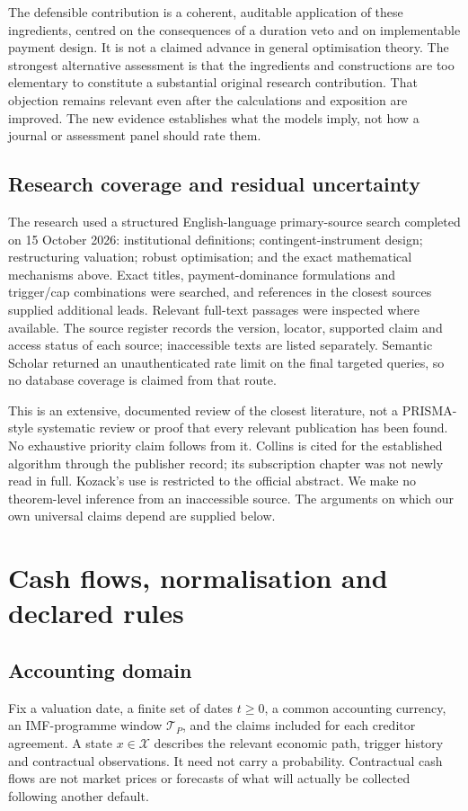 \documentclass[11pt,a4paper]{article}
\begin{document}
The defensible contribution is a coherent, auditable application of these ingredients, centred on the consequences of a duration veto and on implementable payment design. It is not a claimed advance in general optimisation theory. The strongest alternative assessment is that the ingredients and constructions are too elementary to constitute a substantial original research contribution. That objection remains relevant even after the calculations and exposition are improved. The new evidence establishes what the models imply, not how a journal or assessment panel should rate them.

\subsection{Research coverage and residual uncertainty}
The research used a structured English-language primary-source search completed on 15 October 2026: institutional definitions; contingent-instrument design; restructuring valuation; robust optimisation; and the exact mathematical mechanisms above. Exact titles, payment-dominance formulations and trigger/cap combinations were searched, and references in the closest sources supplied additional leads. Relevant full-text passages were inspected where available. The source register records the version, locator, supported claim and access status of each source; inaccessible texts are listed separately. Semantic Scholar returned an unauthenticated rate limit on the final targeted queries, so no database coverage is claimed from that route.

This is an extensive, documented review of the closest literature, not a PRISMA-style systematic review or proof that every relevant publication has been found. No exhaustive priority claim follows from it. Collins is cited for the established algorithm through the publisher record; its subscription chapter was not newly read in full. Kozack's use is restricted to the official abstract. We make no theorem-level inference from an inaccessible source. The arguments on which our own universal claims depend are supplied below.

\section{Cash flows, normalisation and declared rules}
\subsection{Accounting domain}
Fix a valuation date, a finite set of dates $t\geq0$, a common accounting currency, an IMF-programme window $\mathcal T_P$, and the claims included for each creditor agreement. A state $x\in\mathcal X$ describes the relevant economic path, trigger history and contractual observations. It need not carry a probability. Contractual cash flows are not market prices or forecasts of what will actually be collected following another default.
\end{document}
